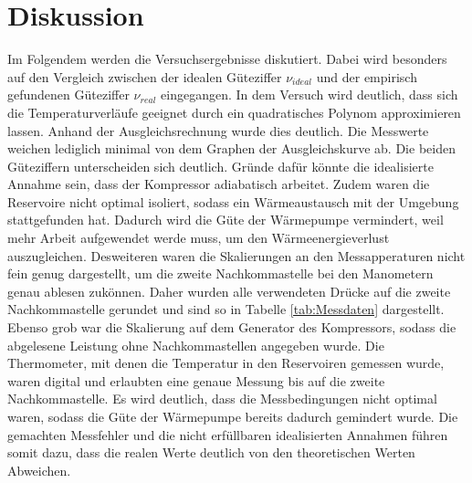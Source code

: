 \section{Diskussion}
Im Folgendem werden die Versuchsergebnisse diskutiert. Dabei wird besonders auf den Vergleich zwischen der idealen Güteziffer $\nu_{ideal}$ und der empirisch gefundenen Güteziffer $\nu_{real}$ eingegangen.
In dem Versuch wird deutlich, dass sich die Temperaturverläufe geeignet durch ein quadratisches Polynom approximieren lassen. Anhand der Ausgleichsrechnung wurde dies deutlich. Die Messwerte weichen lediglich minimal von dem Graphen der Ausgleichskurve ab.
Die beiden Güteziffern unterscheiden sich deutlich. Gründe dafür könnte die idealisierte Annahme sein, dass der Kompressor adiabatisch arbeitet. Zudem waren die Reservoire nicht optimal isoliert, sodass ein Wärmeaustausch mit der Umgebung stattgefunden hat. Dadurch wird die Güte der Wärmepumpe vermindert, weil mehr Arbeit aufgewendet werde muss, um den Wärmeenergieverlust auszugleichen. Desweiteren waren die Skalierungen an den Messapperaturen nicht fein genug dargestellt, um die zweite Nachkommastelle bei den Manometern genau ablesen zukönnen. Daher wurden alle verwendeten Drücke auf die zweite Nachkommastelle gerundet und sind so in Tabelle \ref{tab:Messdaten} dargestellt. Ebenso grob war die Skalierung auf dem Generator des Kompressors, sodass die abgelesene Leistung ohne Nachkommastellen angegeben wurde. Die Thermometer, mit denen die Temperatur in den Reservoiren gemessen wurde, waren digital und erlaubten eine genaue Messung bis auf die zweite Nachkommastelle. Es wird deutlich, dass die Messbedingungen nicht optimal waren, sodass die Güte der Wärmepumpe bereits dadurch gemindert wurde. Die gemachten Messfehler und die nicht erfüllbaren idealisierten Annahmen führen somit dazu, dass die realen Werte deutlich von den theoretischen Werten Abweichen.
\newpage
\FloatBarrier
